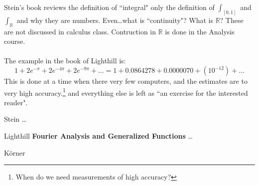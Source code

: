 \documentclass[12pt]{article}
\begin{document}
Stein's book reviews the definition of ``integral" only the definition of $\int_{[0,1]}$ and $\int_\mathbb{R}$ and why they are numbers.  Even\dots what is ``continuity"?  What is $\mathbb{R}$?  These are not discussed in calculus class.  Contruction in $\mathbb{R}$ is done in the Analysis course. \\ \\
The example in the book of Lighthill is:
$$ 1 + 2 e^{-\pi} + 2 e^{-4\pi} + 2 e^{-9\pi} + \dots = 1 + 0.0864278 + 0.0000070 + (10^{-12}) + \dots $$
This is done at a time when there very few computers, and the estimates are to very high accuracy.\footnote{When do we need measurements of high accuracy?} and everything else is left as ``an exercise for the interested reader".
\vfill



\begin{thebibliography}{}

\item Stein \dots
\item Lighthill \textbf{Fourier Analysis and Generalized Functions} \dots
\item K\"{o}rner 
\end{thebibliography}
\end{document}

